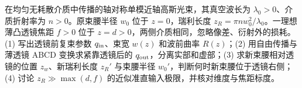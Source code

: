 在均匀无耗散介质中传播的轴对称单模近轴高斯光束，其真空波长为 \(\lambda_0>0\)、介质折射率为 \(n>0\)。原束腰半径 \(w_0\) 位于 \(z=0\)，瑞利长度 \(z_R=\pi n w_0^2/\lambda_0\)。一理想薄凸透镜焦距 \(f>0\) 位于 \(z=d>0\)，两侧介质相同，忽略像差、衍射外的损耗。
(1) 写出透镜前复束参数 \(q_{\rm in}\)、束宽 \(w(z)\) 和波前曲率 \(R(z)\)；(2) 用自由传播与薄透镜 ABCD 变换求紧靠透镜后的 \(q_{\rm out}\)，分离实部和虚部；(3) 求新束腰相对透镜的位置 \(z_w\)、新瑞利长度 \(z_R'\) 与束腰半径 \(w_0'\)，判断何时新束腰位于透镜右侧；(4) 讨论 \(z_R\gg\max(d,f)\) 的近似准直输入极限，并核对维度与焦距标度。
